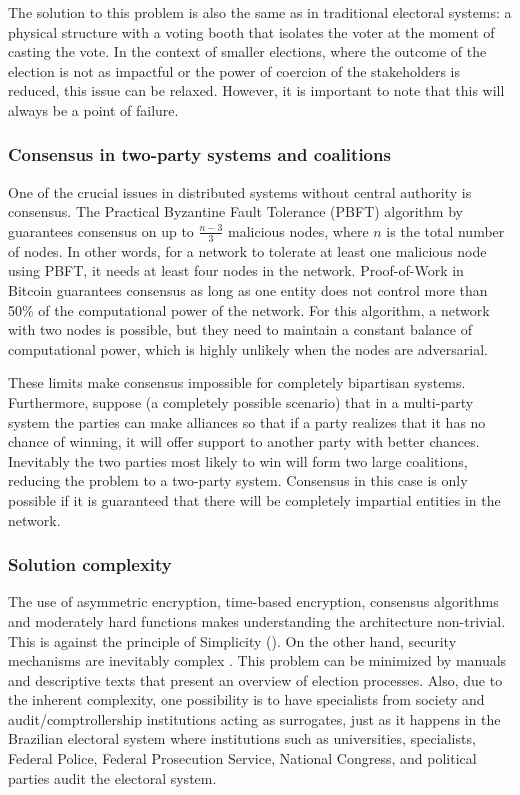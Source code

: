 \documentclass[english]{textolivre}
\begin{document}
The solution to this problem is also the same as in traditional electoral systems: a physical structure with a voting booth that isolates the voter at the moment of casting the vote. In the context of smaller elections, where the outcome of the election is not as impactful or the power of coercion of the stakeholders is reduced, this issue can be relaxed. However, it is important to note that this will always be a point of failure.

\subsubsection{Consensus in two-party systems and coalitions}

One of the crucial issues in distributed systems without central authority is consensus. The Practical Byzantine Fault Tolerance (PBFT) algorithm by \textcite{liskov} guarantees consensus on up to $\frac{n-3}{3}$  malicious nodes, where $n$ is the total number of nodes. In other words, for a network to tolerate at least one malicious node using PBFT, it needs at least four nodes in the network. Proof-of-Work in Bitcoin guarantees consensus as long as one entity does not control more than 50\% of the computational power of the network. For this algorithm, a network with two nodes is possible, but they need to maintain a constant balance of computational power, which is highly unlikely when the nodes are adversarial.

These limits make consensus impossible for completely bipartisan systems. Furthermore, suppose (a completely possible scenario) that in a multi-party system the parties can make alliances so that if a party realizes that it has no chance of winning, it will offer support to another party with better chances. Inevitably the two parties most likely to win will form two large coalitions, reducing the problem to a two-party system. Consensus in this case is only possible if it is guaranteed that there will be completely impartial entities in the network.

\subsubsection{Solution complexity}

The use of asymmetric encryption, time-based encryption, consensus algorithms and moderately hard functions makes understanding the architecture non-trivial. This is against the principle of Simplicity (). On the other hand, security mechanisms are inevitably complex \cite{stallings}. This problem can be minimized by manuals and descriptive texts that present an overview of election processes. Also, due to the inherent complexity, one possibility is to have specialists from society and audit/comptrollership institutions acting as surrogates, just as it happens in the Brazilian electoral system where institutions such as universities, specialists, Federal Police, Federal Prosecution Service, National Congress, and political parties audit the electoral system.
\end{document}
